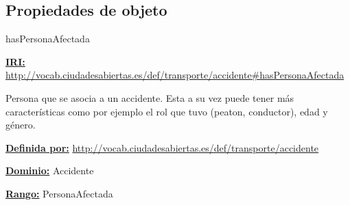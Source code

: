 \subsection{Propiedades de objeto}




\begin{mybox}{hasPersonaAfectada}
\begin{flushleft}
\underline{\textbf{IRI:}}
\url{http://vocab.ciudadesabiertas.es/def/transporte/accidente#hasPersonaAfectada}
\newline

Persona que se asocia a un accidente. Esta a su vez puede tener más características como por ejemplo el rol que tuvo (peaton, conductor), edad y género.
\newline

\underline{\textbf{Definida por:}}
\newline \url{http://vocab.ciudadesabiertas.es/def/transporte/accidente}
\newline

\underline{\textbf{Dominio:}} 	
\newline Accidente
\newline

\underline{\textbf{Rango:}} 
\newline PersonaAfectada

\end{flushleft}
\end{mybox}




